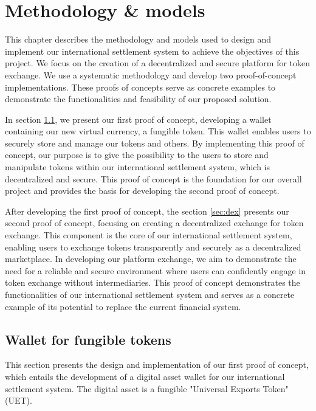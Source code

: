 \chapter{Methodology \& models}
\label{ch:methodology}

This chapter describes the methodology and models used to design and implement our international settlement system to achieve
the objectives of this project. We focus on the creation of a decentralized and secure platform for token exchange. We use a systematic methodology
and develop two proof-of-concept implementations. These proofs of concepts serve as concrete examples to demonstrate the functionalities and
feasibility of our proposed solution.


In section \ref{sec:wallet_fungible_tokens}, we present our first proof of concept, developing a wallet containing our new virtual currency, a fungible token.
This wallet enables users to securely store and manage our tokens and others. By implementing this proof of concept, our purpose is to give the possibility
to the users to store and manipulate tokens within our international settlement system, which is decentralized and secure.
This proof of concept is the foundation for our overall project and provides the basis for developing the second proof of concept.

After developing the first proof of concept, the section \ref{sec:dex} presents our second proof of concept, focusing on creating
a decentralized exchange for token exchange.  This component is the core of our international settlement system, enabling users to
exchange tokens transparently and securely as a decentralized marketplace. In developing our platform exchange, we aim to
demonstrate the need for a reliable and secure environment where users can confidently engage in token exchange without
intermediaries. This proof of concept demonstrates the functionalities of our international settlement system and serves as a concrete example
of its potential to replace the current financial system.


\section{Wallet for fungible tokens}
\label{sec:wallet_fungible_tokens}



This section presents the design and implementation of our first proof of concept, which entails the development of a digital asset wallet
for our international settlement system. The digital asset is a fungible "Universal Exports Token" (UET).


